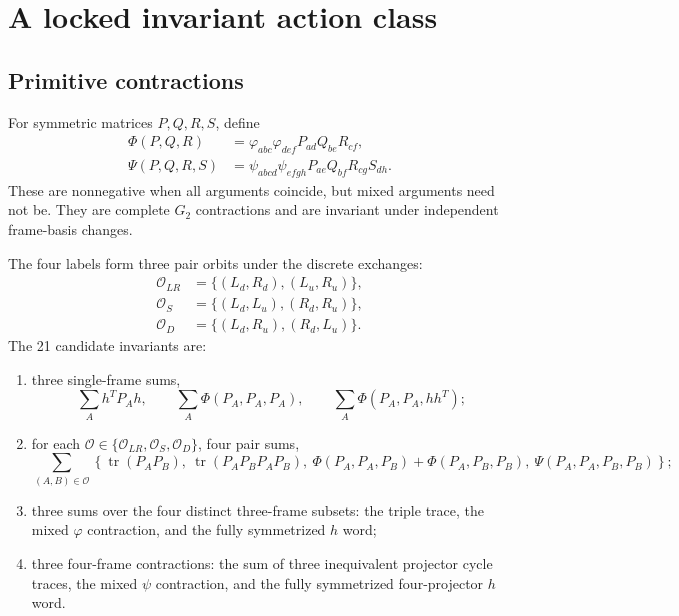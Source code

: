 \documentclass[11pt]{article}
\newcommand{\tr}{\operatorname{tr}}
\begin{document}
\section{A locked invariant action class}

\subsection{Primitive contractions}

For symmetric matrices $P,Q,R,S$, define
\begin{align}
  \Phi(P,Q,R)
  &=\varphi_{abc}\varphi_{def}P_{ad}Q_{be}R_{cf},
  \label{eq:PhiProj}\\
  \Psi(P,Q,R,S)
  &=\psi_{abcd}\psi_{efgh}P_{ae}Q_{bf}R_{cg}S_{dh}.
  \label{eq:PsiProj}
\end{align}
These are nonnegative when all arguments coincide, but mixed arguments need not be.  They are complete $G_2$ contractions and are invariant under independent frame-basis changes.

The four labels form three pair orbits under the discrete exchanges:
\begin{align}
  \mathcal O_{LR}&=\{(L_d,R_d),(L_u,R_u)\},\\
  \mathcal O_{S}&=\{(L_d,L_u),(R_d,R_u)\},\\
  \mathcal O_{D}&=\{(L_d,R_u),(R_d,L_u)\}.
\end{align}
The 21 candidate invariants are:
\begin{enumerate}[label=\arabic*.,leftmargin=2.2em]
  \item three single-frame sums,
  \begin{equation}
    \sum_A h^TP_Ah,\qquad
    \sum_A\Phi(P_A,P_A,P_A),\qquad
    \sum_A\Phi(P_A,P_A,hh^T);
  \end{equation}
  \item for each $\mathcal O\in\{\mathcal O_{LR},\mathcal O_S,\mathcal O_D\}$, four pair sums,
  \begin{equation}
  \sum_{(A,B)\in\mathcal O}
  \left\{
  \tr(P_AP_B),\ \tr(P_AP_BP_AP_B),\
  \Phi(P_A,P_A,P_B)+\Phi(P_A,P_B,P_B),\
  \Psi(P_A,P_A,P_B,P_B)
  \right\};
  \end{equation}
  \item three sums over the four distinct three-frame subsets: the triple trace, the mixed $\varphi$ contraction, and the fully symmetrized $h$ word;
  \item three four-frame contractions: the sum of three inequivalent projector cycle traces, the mixed $\psi$ contraction, and the fully symmetrized four-projector $h$ word.
\end{enumerate}
\end{document}
